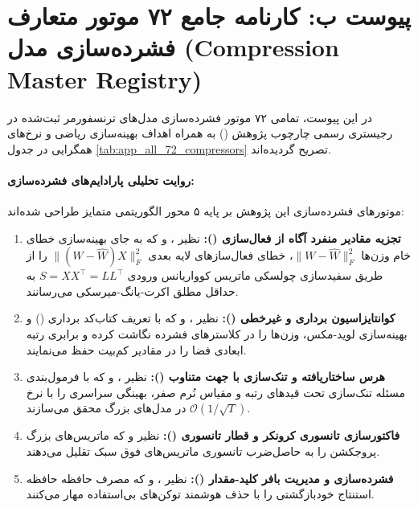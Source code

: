 
\clearpage

\section*{پیوست ب: کارنامه جامع ۷۲ موتور متعارف فشرده‌سازی مدل (Compression Master Registry)}

در این پیوست، تمامی ۷۲ موتور فشرده‌سازی مدل‌های ترنسفورمر ثبت‌شده در رجیستری رسمی چارچوب پژوهش () به همراه اهداف بهینه‌سازی ریاضی و نرخ‌های همگرایی در جدول \ref{tab:app_all_72_compressors} تصریح گردیده‌اند.

\paragraph{روایت تحلیلی پارادایم‌های فشرده‌سازی:}
موتورهای فشرده‌سازی این پژوهش بر پایه ۵ محور الگوریتمی متمایز طراحی شده‌اند:
\begin{enumerate}
    \item \textbf{تجزیه مقادیر منفرد آگاه از فعال‌سازی ():} نظیر ،  و  که به جای بهینه‌سازی خطای خام وزن‌ها $\|W - \hat{W}\|_F^2$، خطای فعال‌سازهای لایه بعدی $\|(W - \hat{W}) X\|_F^2$ را از طریق سفیدسازی چولسکی ماتریس کوواریانس ورودی $S = X X^\top = L L^\top$ به حداقل مطلق اکرت-یانگ-میرسکی می‌رسانند.
    \item \textbf{کوانتایزاسیون برداری و غیرخطی ():} نظیر ،  و  که با تعریف کتاب‌کد برداری () و بهینه‌سازی لوید-مکس، وزن‌ها را در کلاسترهای فشرده نگاشت کرده و برابری رتبه ابعادی فضا را در مقادیر کم‌بیت حفظ می‌نمایند.
    \item \textbf{هرس ساختاریافته و تنک‌سازی با جهت متناوب ():} نظیر ،  و  که با فرمول‌بندی مسئله تنک‌سازی تحت قیدهای رتبه و مقیاس نُرم صفر، بهینگی سراسری را با نرخ $\mathcal{O}(1/\sqrt{T})$ در مدل‌های بزرگ محقق می‌سازند.
    \item \textbf{فاکتورسازی تانسوری کرونکر و قطار تانسوری ():} نظیر  و  که ماتریس‌های بزرگ پروجکشن را به حاصل‌ضرب تانسوری ماتریس‌های فوق سبک تقلیل می‌دهند.
    \item \textbf{فشرده‌سازی و مدیریت بافر کلید-مقدار ():} نظیر ،  و  که مصرف حافظه حافظه استنتاج خودبازگشتی را با حذف هوشمند توکن‌های بی‌استفاده مهار می‌کنند.
\end{enumerate}

